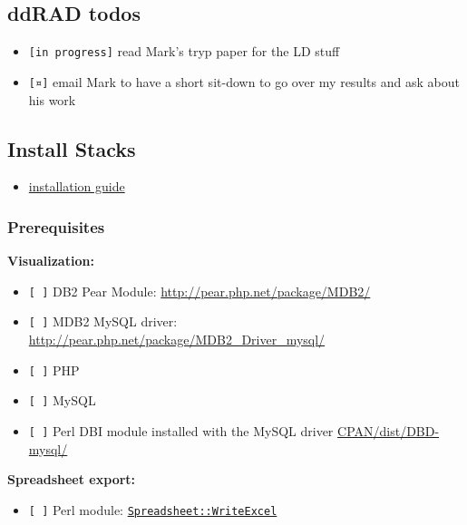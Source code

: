 \documentclass[letterpaper]{scrartcl}
\begin{document}
\subsection{ddRAD todos}\label{ddrad-todos}

\begin{itemize}
\itemsep1pt\parskip0pt
\item
  \texttt{{[}in progress{]}} read Mark's tryp paper for the LD stuff
\item
  \texttt{{[}¤{]}} email Mark to have a short sit-down to go over my
  results and ask about his work
\end{itemize}

\subsection{Install Stacks}\label{install-stacks-1}

\begin{itemize}
\itemsep1pt\parskip0pt
\item
  \href{http://creskolab.uoregon.edu/stacks/manual/\#install}{installation
  guide}
\end{itemize}

\subsubsection{Prerequisites}\label{prerequisites}

\textbf{Visualization:}

\begin{itemize}
\itemsep1pt\parskip0pt
\item
  \texttt{{[} {]}} DB2 Pear Module:
  \url{http://pear.php.net/package/MDB2/}
\item
  \texttt{{[} {]}} MDB2 MySQL driver:
  \url{http://pear.php.net/package/MDB2_Driver_mysql/}
\item
  \texttt{{[} {]}} PHP
\item
  \texttt{{[} {]}} MySQL
\item
  \texttt{{[} {]}} Perl DBI module installed with the MySQL driver
  \href{http://search.cpan.org/dist/DBD-mysql/}{CPAN/dist/DBD-mysql/}
\end{itemize}

\textbf{Spreadsheet export:}

\begin{itemize}
\itemsep1pt\parskip0pt
\item
  \texttt{{[} {]}} Perl module:
  \href{http://search.cpan.org/~jmcnamara/Spreadsheet-WriteExcel-2.37/}{\texttt{Spreadsheet::WriteExcel}}
\end{itemize}
\end{document}
